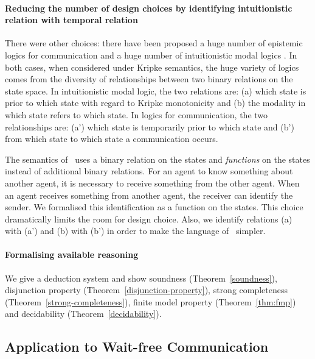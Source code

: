 \paragraph{Reducing the number of design choices by identifying intuitionistic relation
    with temporal relation}
There were other choices: there have been proposed a huge number
 of epistemic logics for communication
\cite{halpern1990knowledge,van2009information,liau2003belief,%
plaza2007logics,%
balbiani2008knowable,%
 peleg1987communication,%
bieber1990logic,baltag2007epistemic,jia2004modal,costa2005formalizing}
and a huge
number of intuitionistic modal logics
\cite{hiroakira-some, 1029823, 1986,
alechina-categorical,
peleg1987communication}.
In both cases, when considered under Kripke semantics,
the huge variety of logics comes
 from the diversity of relationships
between two binary relations on the state space.
In intuitionistic modal logic, the two relations are:
(a) which state is prior to which state with regard to
Kripke monotonicity and (b) the modality in which state refers to which state.
In logics for communication, the two relationships are:
(a') which state is temporarily prior to which state and
(b') from which state to which state a communication occurs.

The semantics of \iec\, uses a
binary relation on the states and
\textit{functions} on the states instead of
additional binary relations.
For an agent to know something about another agent, it is necessary to
receive something from the other agent.
When an agent receives something from another agent,
the receiver can identify the sender.  We formalised this identification as a function on
the states.
This choice dramatically limits the
room for design choice.
Also, we identify relations
(a) with (a') and (b) with (b') in order to make the language of \iec\,
simpler.

\paragraph{Formalising available reasoning}
We give a deduction system and show
soundness (Theorem~\ref{soundness}), disjunction property (Theorem~\ref{disjunction-property}),
strong completeness
(Theorem~\ref{strong-completeness}), finite model property
 (Theorem~\ref{thm:fmp}) and decidability (Theorem~\ref{decidability}).

\subsection{Application to Wait-free Communication}

